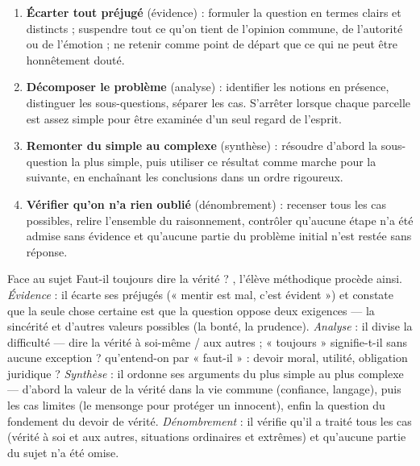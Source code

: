 \documentclass[11pt]{article}
\begin{document}
\begin{methode}
\begin{enumerate}
  \item \textbf{Écarter tout préjugé} (évidence) : formuler la question en termes clairs et distincts ; suspendre tout ce qu'on tient de l'opinion commune, de l'autorité ou de l'émotion ; ne retenir comme point de départ que ce qui ne peut être honnêtement douté.
  \item \textbf{Décomposer le problème} (analyse) : identifier les notions en présence, distinguer les sous-questions, séparer les cas. S'arrêter lorsque chaque parcelle est assez simple pour être examinée d'un seul regard de l'esprit.
  \item \textbf{Remonter du simple au complexe} (synthèse) : résoudre d'abord la sous-question la plus simple, puis utiliser ce résultat comme marche pour la suivante, en enchaînant les conclusions dans un ordre rigoureux.
  \item \textbf{Vérifier qu'on n'a rien oublié} (dénombrement) : recenser tous les cas possibles, relire l'ensemble du raisonnement, contrôler qu'aucune étape n'a été admise sans évidence et qu'aucune partie du problème initial n'est restée sans réponse.
\end{enumerate}
\end{methode}

\begin{exemplebox}
Face au sujet \guillemotleft Faut-il toujours dire la vérité ? \guillemotright, l'élève méthodique procède ainsi. \emph{Évidence} : il écarte ses préjugés (« mentir est mal, c'est évident ») et constate que la seule chose certaine est que la question oppose deux exigences — la sincérité et d'autres valeurs possibles (la bonté, la prudence). \emph{Analyse} : il divise la difficulté — dire la vérité à soi-même / aux autres ; « toujours » signifie-t-il sans aucune exception ? qu'entend-on par « faut-il » : devoir moral, utilité, obligation juridique ? \emph{Synthèse} : il ordonne ses arguments du plus simple au plus complexe — d'abord la valeur de la vérité dans la vie commune (confiance, langage), puis les cas limites (le mensonge pour protéger un innocent), enfin la question du fondement du devoir de vérité. \emph{Dénombrement} : il vérifie qu'il a traité tous les cas (vérité à soi et aux autres, situations ordinaires et extrêmes) et qu'aucune partie du sujet n'a été omise.
\end{exemplebox}
\end{document}

